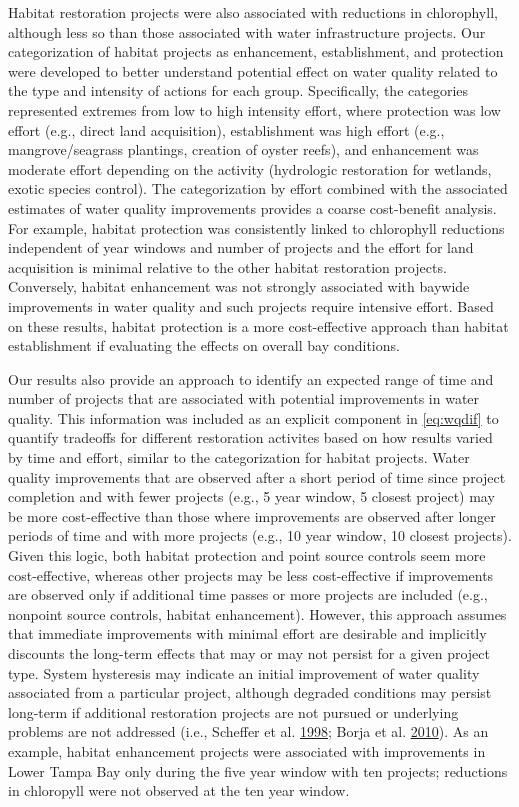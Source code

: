 \documentclass[]{article}
\begin{document}
Habitat restoration projects were also associated with reductions in
chlorophyll, although less so than those associated with water
infrastructure projects. Our categorization of habitat projects as
enhancement, establishment, and protection were developed to better
understand potential effect on water quality related to the type and
intensity of actions for each group. Specifically, the categories
represented extremes from low to high intensity effort, where protection
was low effort (e.g., direct land acquisition), establishment was high
effort (e.g., mangrove/seagrass plantings, creation of oyster reefs),
and enhancement was moderate effort depending on the activity
(hydrologic restoration for wetlands, exotic species control). The
categorization by effort combined with the associated estimates of water
quality improvements provides a coarse cost-benefit analysis. For
example, habitat protection was consistently linked to chlorophyll
reductions independent of year windows and number of projects and the
effort for land acquisition is minimal relative to the other habitat
restoration projects. Conversely, habitat enhancement was not strongly
associated with baywide improvements in water quality and such projects
require intensive effort. Based on these results, habitat protection is
a more cost-effective approach than habitat establishment if evaluating
the effects on overall bay conditions.

Our results also provide an approach to identify an expected range of
time and number of projects that are associated with potential
improvements in water quality. This information was included as an
explicit component in \cref{eq:wqdif} to quantify tradeoffs for
different restoration activites based on how results varied by time and
effort, similar to the categorization for habitat projects. Water
quality improvements that are observed after a short period of time
since project completion and with fewer projects (e.g., 5 year window, 5
closest project) may be more cost-effective than those where
improvements are observed after longer periods of time and with more
projects (e.g., 10 year window, 10 closest projects). Given this logic,
both habitat protection and point source controls seem more
cost-effective, whereas other projects may be less cost-effective if
improvements are observed only if additional time passes or more
projects are included (e.g., nonpoint source controls, habitat
enhancement). However, this approach assumes that immediate improvements
with minimal effort are desirable and implicitly discounts the long-term
effects that may or may not persist for a given project type. System
hysteresis may indicate an initial improvement of water quality
associated from a particular project, although degraded conditions may
persist long-term if additional restoration projects are not pursued or
underlying problems are not addressed (i.e., Scheffer et al.
\protect\hyperlink{ref-Scheffer98}{1998}; Borja et al.
\protect\hyperlink{ref-Borja10}{2010}). As an example, habitat
enhancement projects were associated with improvements in Lower Tampa
Bay only during the five year window with ten projects; reductions in
chloropyll were not observed at the ten year window.
\end{document}
